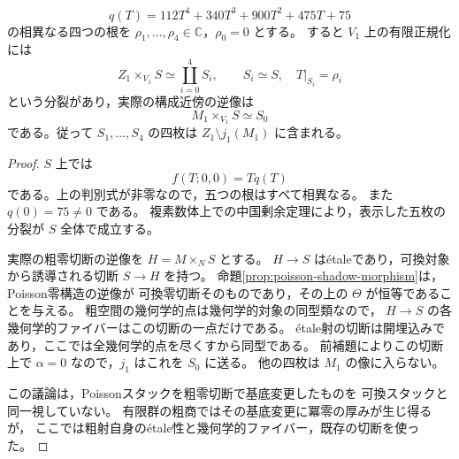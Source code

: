 \begin{corollary}[粗零切断上の五枚と欠落する四枚]
\label{cor:degree-one-five-sheets-zero}
\[
 q(T)=112T^4+340T^3+900T^2+475T+75
\]
の相異なる四つの根を $\rho_1,\ldots,\rho_4\in\mathbb C$，$\rho_0=0$ とする。
すると $V_1$ 上の有限正規化には
\[
             Z_1\times_{V_1}S\simeq\coprod_{i=0}^4 S_i,
             \qquad S_i\simeq S,\quad T|_{S_i}=\rho_i
\]
という分裂があり，実際の構成近傍の逆像は
\[
                  M_1\times_{V_1}S\simeq S_0
\]
である。従って $S_1,\ldots,S_4$ の四枚は $Z_1\setminus j_1(M_1)$ に含まれる。
\end{corollary}
\begin{proof}
$S$ 上では
\[
 f(T;0,0)=Tq(T)
\]
である。上の判別式が非零なので，五つの根はすべて相異なる。
また $q(0)=75\ne0$ である。
複素数体上での中国剰余定理により，表示した五枚の分裂が $S$ 全体で成立する。

実際の粗零切断の逆像を $H=M\times_NS$ とする。
$H\to S$ は\'{e}taleであり，可換対象から誘導される切断 $S\to H$ を持つ。
命題\ref{prop:poisson-shadow-morphism}は，Poisson零構造の逆像が
可換零切断そのものであり，その上の $\Theta$ が恒等であることを与える。
粗空間の幾何学的点は幾何学的対象の同型類なので，
$H\to S$ の各幾何学的ファイバーはこの切断の一点だけである。
\'{e}tale射の切断は開埋込みであり，ここでは全幾何学的点を尽くすから同型である。
前補題によりこの切断上で $\alpha=0$ なので，$j_1$ はこれを $S_0$ に送る。
他の四枚は $M_1$ の像に入らない。

この議論は，Poissonスタックを粗零切断で基底変更したものを
可換スタックと同一視していない。
有限群の粗商ではその基底変更に冪零の厚みが生じ得るが，
ここでは粗射自身の\'{e}tale性と幾何学的ファイバー，既存の切断を使った。
\end{proof}

